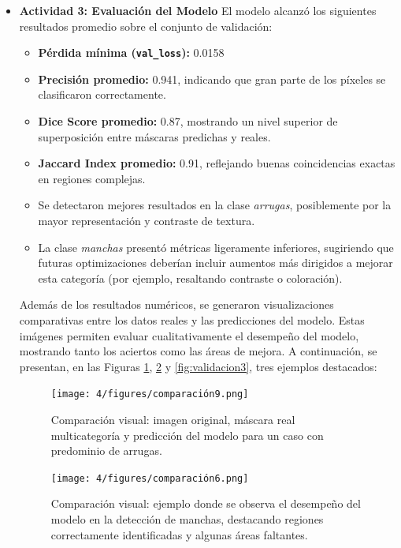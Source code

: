 \begin{enumerate}
\begin{itemize}
\vspace{0.5cm}

  \item\textbf{Actividad 3: Evaluación del Modelo}
  El modelo alcanzó los siguientes resultados promedio sobre el conjunto de validación:
\begin{itemize}
  \item \textbf{Pérdida mínima (\texttt{val\_loss}):} 0.0158 
  \item \textbf{Precisión promedio:} 0.941, indicando que gran parte de los píxeles se clasificaron correctamente.
  \item \textbf{Dice Score promedio:} 0.87, mostrando un nivel superior de superposición entre máscaras predichas y reales.
  \item \textbf{Jaccard Index promedio:} 0.91, reflejando buenas coincidencias exactas en regiones complejas.
  \item Se detectaron mejores resultados en la clase \emph{arrugas}, posiblemente por la mayor representación y contraste de textura.
  \item La clase \emph{manchas} presentó métricas ligeramente inferiores, sugiriendo que futuras optimizaciones deberían incluir aumentos más dirigidos a mejorar esta categoría (por ejemplo, resaltando contraste o coloración).
\end{itemize}

\vspace{0.5cm}

Además de los resultados numéricos, se generaron visualizaciones comparativas entre los datos reales y las predicciones del modelo. Estas imágenes permiten evaluar cualitativamente el desempeño del modelo, mostrando tanto los aciertos como las áreas de mejora. A continuación, se presentan, en las Figuras \ref{fig:validacion1}, \ref{fig:validacion2} y \ref{fig:validacion3}, tres ejemplos destacados:

\vspace{0.5cm}

\begin{figure}[H]
\centering
\texttt{[image: 4/figures/comparación9.png]}
\caption{Comparación visual: imagen original, máscara real multicategoría y predicción del modelo para un caso con predominio de arrugas.}
\label{fig:validacion1}
\end{figure}

\begin{figure}[H]
\centering
\texttt{[image: 4/figures/comparación6.png]}
\caption{Comparación visual: ejemplo donde se observa el desempeño del modelo en la detección de manchas, destacando regiones correctamente identificadas y algunas áreas faltantes.}
\label{fig:validacion2}
\end{figure}


\end{itemize}
\end{enumerate}
